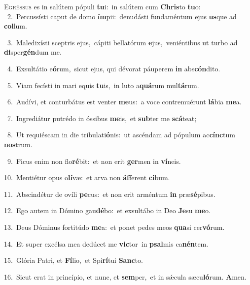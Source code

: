 \lettrine{\initial\textcolor{\initialcolor}{E}}{gréssus} es in salútem pópuli \textbf{tu}\-i:~\star in salútem cum \textbf{Chris}\-to \textbf{tu}\-o:\\
{\numbfont\textcolor{\numbcolor}{~2.}}~Percussísti caput de domo \textbf{ím}\-pii:~\star denudásti fundaméntum ejus \textbf{us}\-que ad \textbf{col}\-lum.\par
{\numbfont\textcolor{\numbcolor}{~3.}}~Maledixísti sceptris ejus,~\dagger cápiti bellatórum \textbf{e}\-jus,~\star veniéntibus ut turbo ad \textbf{di}\-sper\-\textbf{gén}\-dum me.\par
{\numbfont\textcolor{\numbcolor}{~4.}}~Exsultátio e\-\textbf{ó}\-rum,~\star sicut ejus, qui dévorat páuperem \textbf{in} abs\-\textbf{cón}\-dito.\par
{\numbfont\textcolor{\numbcolor}{~5.}}~Viam fecísti in mari equis \textbf{tu}\-is,~\star in luto a\-\textbf{quá}\-rum mul\-\textbf{tá}\-rum.\par
{\numbfont\textcolor{\numbcolor}{~6.}}~Audívi, et conturbátus est venter \textbf{me}\-us:~\star a voce contremuérunt \textbf{lá}\-bia \textbf{me}\-a.\par
{\numbfont\textcolor{\numbcolor}{~7.}}~Ingrediátur putrédo in óssibus \textbf{me}\-is,~\star et \textbf{sub}\-ter me \textbf{scá}\-teat;\par
{\numbfont\textcolor{\numbcolor}{~8.}}~Ut requiéscam in die tribulati\-\textbf{ó}\-nis:~\star ut ascéndam ad pópulum ac\-\textbf{cínc}\-tum \textbf{nos}\-trum.\par
{\numbfont\textcolor{\numbcolor}{~9.}}~Ficus enim non flo\-\textbf{ré}\-bit:~\star et non erit \textbf{ger}\-men in \textbf{ví}\-neis.\par
{\numbfont\textcolor{\numbcolor}{10.}}~Mentiétur opus o\-\textbf{lí}\-væ:~\star et arva non \textbf{áf}\-ferent \textbf{ci}\-bum.\par
{\numbfont\textcolor{\numbcolor}{11.}}~Abscindétur de ovíli \textbf{pe}\-cus:~\star et non erit arméntum \textbf{in} præ\-\textbf{sé}\-pibus.\par
{\numbfont\textcolor{\numbcolor}{12.}}~Ego autem in Dómino gau\-\textbf{dé}\-bo:~\star et exsultábo in Deo \textbf{Je}\-su \textbf{me}\-o.\par
{\numbfont\textcolor{\numbcolor}{13.}}~Deus Dóminus fortitúdo \textbf{me}\-a:~\star et ponet pedes meos \textbf{qua}\-si cer\-\textbf{vó}\-rum.\par
{\numbfont\textcolor{\numbcolor}{14.}}~Et super excélsa mea dedúcet me \textbf{vic}\-tor~\star in \textbf{psal}\-mis ca\-\textbf{nén}\-tem.\par
{\numbfont\textcolor{\numbcolor}{15.}}~Glória Patri, et \textbf{Fí}\-lio,~\star et Spi\-\textbf{rí}\-tui \textbf{Sanc}\-to.\par
{\numbfont\textcolor{\numbcolor}{16.}}~Sicut erat in princípio, et nunc, et \textbf{sem}\-per,~\star et in sǽcula sæcu\-\textbf{ló}\-rum. \textbf{A}\-men.\par

